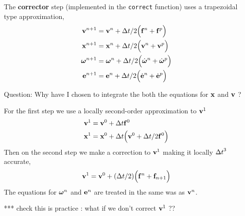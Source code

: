 The {\bf corrector} step (implemented in the {\tt correct} function) uses a trapezoidal
type approximation,
\begin{align}
    \mathbf{ v}^{n+1} &= \mathbf{ v}^{n} + {\Delta t}/2\Big( \mathbf{ f}^{n} + \mathbf{ f}^p \Big)  \label{eq:rbCorrectorV} \\
    \mathbf{ x}^{n+1} &= \mathbf{ x}^n   + {\Delta t}/2\Big( \mathbf{ v}^{n} + \mathbf{ v}^p \Big) \\
    \boldsymbol{\omega}^{n+1} &= \boldsymbol{\omega}^n + {\Delta t}/2 \Big( \dot{\boldsymbol{\omega}}^{n} + \dot{\boldsymbol{\omega}}^p \Big) \\
    \mathbf{ e}^{n+1} &= \mathbf{ e}^n + {\Delta t}/2 \Big( \dot{\mathbf{ e}}^{n} + \dot{\mathbf{ e}}^p \Big)
\end{align}


Question: Why have I chosen to integrate the both the equations for $\mathbf{ x}$ and $\mathbf{ v}$ ?



For the first step we use a locally second-order approximation to $\mathbf{ v}^1$ 
\begin{align*}
    \mathbf{ v}^{1} &= \mathbf{ v}^{0} + {\Delta t} \mathbf{ f}^0  \\
    \mathbf{ x}^{1} &= \mathbf{ x}^0   + {\Delta t}\Big( \mathbf{ v}^0 + {\Delta t}/2 \mathbf{ f}^0 \Big) \\
\end{align*}
Then on the second step we make a correction to $\mathbf{ v}^{1}$ making it locally ${\Delta t}^3$ accurate,
\begin{align*}
    \mathbf{ v}^{1} &= \mathbf{ v}^{0} + ({\Delta t}/2)\Big( \mathbf{ f}^n +\mathbf{ f}_{n+1} \Big) \\
\end{align*}
The equations for $\boldsymbol{\omega}^n$ and $\mathbf{ e}^n$ are treated in the same was as $\mathbf{ v}^n$.

*** check this is practice : what if we don't correct $\mathbf{ v}^1$ ??



